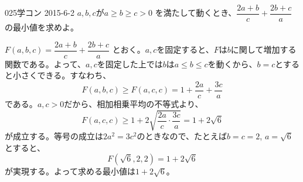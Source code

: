 \begin{prob}{025}{}{学コン 2015-6-2}
 $a,b,c$が$a \ge b \ge c > 0$ を満たして動くとき、$\dfrac{2a+b}{c}+\dfrac{2b+c}{a}$の最小値を求めよ。
\end{prob}

$F(a, b, c)=\dfrac{2a+b}{c}+\dfrac{2b+c}{a}$ とおく。$a, c$を固定すると、$F$は$b$に関して増加する関数である。よって、$a, c$を固定した上では$b$は$a\le b\le c$を動くから、$b=c$とすると小さくできる。すなわち、
\[ F(a, b, c)\ge F(a, c, c)=1+\frac{2a}{c}+\frac{3c}{a} \]
である。$a, c>0$だから、相加相乗平均の不等式より、
\[ F(a, c, c)\ge 1+2\sqrt{\frac{2a}{c}\cdot\frac{3c}{a}}=1+2\sqrt{6} \]
が成立する。等号の成立は$2a^2=3c^2$のときなので、たとえば$b=c=2$, $a=\sqrt{6}$とすると、
\[ F(\sqrt{6}, 2, 2)=1+2\sqrt{6} \]
が実現する。よって求める最小値は$1+2\sqrt{6}$。